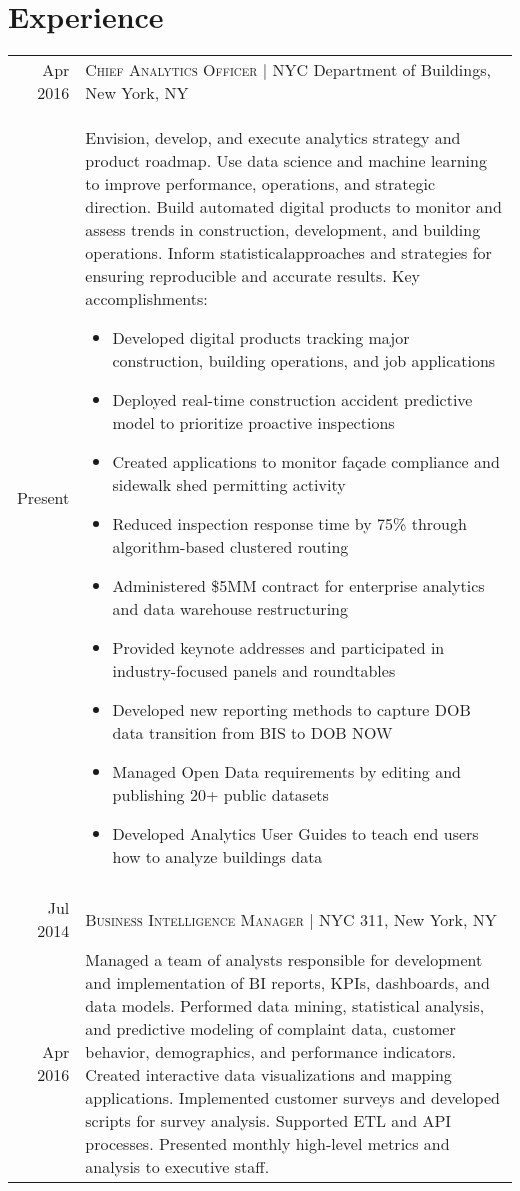 \documentclass[a4paper,10pt]{article}
\begin{document}
\section{Experience}
\begin{tabular}{r|p{13cm}}
 {Apr 2016} & \textsc{Chief Analytics Officer} | NYC Department of Buildings, New York, NY \\{Present}&\footnotesize{Envision, develop, and execute analytics strategy and product roadmap. Use data science and machine learning to improve performance, operations, and strategic direction. Build automated digital products to monitor and assess trends in construction, development, and building operations. Inform statistical\hfill \break approaches and strategies for ensuring reproducible and accurate results. Key accomplishments:}
 \begin{itemize}
        \item Developed digital products tracking major construction, building operations, and job applications 
        \item Deployed real-time construction accident predictive model to prioritize proactive inspections
        \item Created applications to monitor façade compliance and sidewalk shed permitting activity
		\item Reduced inspection response time by 75\% through algorithm-based clustered routing
		\item Administered \$5MM  contract for enterprise analytics and data warehouse restructuring
		\item Provided keynote addresses and participated in industry-focused panels and roundtables
		\item Developed new reporting methods to capture DOB data transition from BIS to DOB NOW
		\item Managed Open Data requirements by editing and publishing 20+ public datasets
		\item Developed Analytics User Guides to teach end users how to analyze buildings data
	\end{itemize}\vspace{-1.6em}\\\multicolumn{2}{c}{} \\{Jul 2014} & \textsc{Business Intelligence Manager} | NYC 311, New York, NY \\{Apr 2016}&\footnotesize{Managed a team of analysts responsible for development and implementation of BI reports, KPIs, dashboards, and data models. Performed data mining, statistical analysis, and predictive modeling of complaint data, customer behavior, demographics, and performance indicators. Created interactive data visualizations and mapping applications. Implemented customer surveys and developed scripts for survey analysis. Supported ETL and API processes. Presented monthly high-level metrics and analysis to executive staff.}

\end{tabular}
\end{document}

